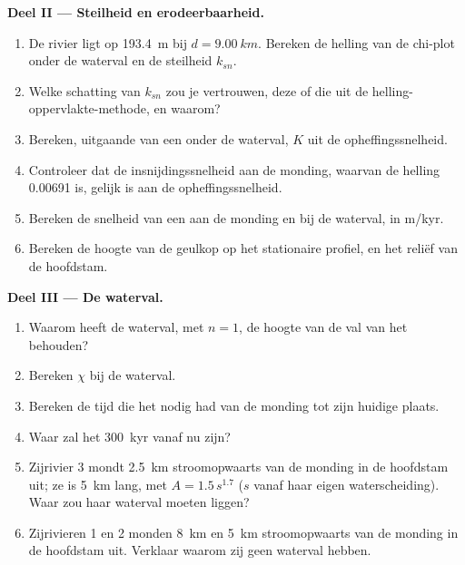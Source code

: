 \begin{problem}
\medskip\noindent\textbf{Deel II --- Steilheid en erodeerbaarheid.}
\begin{enumerate}[resume]
\item De rivier ligt op \qty{193.4}{m} bij $d = \qty{9.00}{km}$. Bereken de
  helling van de chi-plot onder de waterval en de steilheid $k_{sn}$.
\item Welke schatting van $k_{sn}$ zou je vertrouwen, deze of die uit de
  helling-oppervlakte-methode, en waarom?
\item Bereken, uitgaande van een  onder de waterval, $K$
  uit de opheffingssnelheid.
\item Controleer dat de insnijdingssnelheid aan de monding, waarvan de helling
  0.00691 is, gelijk is aan de opheffingssnelheid.
\item Bereken de snelheid van een  aan de monding en bij de waterval,
  in m/kyr.
\item Bereken de hoogte van de geulkop op het stationaire profiel, en het
  reliëf van de hoofdstam.
\end{enumerate}

\medskip\noindent\textbf{Deel III --- De waterval.}
\begin{enumerate}[resume]
\item Waarom heeft de waterval, met $n = 1$, de hoogte van de val van het
   behouden?
\item Bereken $\chi$ bij de waterval.
\item Bereken de tijd die het  nodig had van de monding tot zijn
  huidige plaats.
\item Waar zal het \qty{300}{kyr} vanaf nu zijn?
\item Zijrivier 3 mondt \qty{2.5}{km} stroomopwaarts van de monding in de
  hoofdstam uit; ze is \qty{5}{km} lang, met $A = 1.5\,s^{1.7}$ ($s$ vanaf
  haar eigen waterscheiding). Waar zou haar waterval moeten liggen?
\item Zijrivieren 1 en 2 monden \qty{8}{km} en \qty{5}{km} stroomopwaarts van
  de monding in de hoofdstam uit. Verklaar waarom zij geen waterval hebben.
\end{enumerate}


\end{problem}
